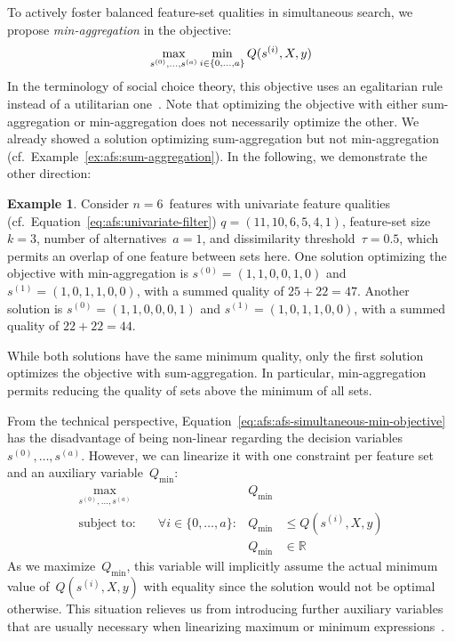 \documentclass{article}
\theoremstyle{definition}
\newtheorem{example}{Example}
\begin{document}
To actively foster balanced feature-set qualities in simultaneous search, we propose \emph{min-aggregation} in the objective:
%
\begin{equation}
	\max_{s^{(0)}, \dots, s^{(a)}} \min_{i \in \{0, \dots, a\}} Q(s^{(i)},X,y) \\
	\label{eq:afs:afs-simultaneous-min-objective}
\end{equation}
%
In the terminology of social choice theory, this objective uses an egalitarian rule instead of a utilitarian one~\cite{myerson1981utilitarianism}.
Note that optimizing the objective with either sum-aggregation or min-aggregation does not necessarily optimize the other.
We already showed a solution optimizing sum-aggregation but not min-aggregation (cf.~Example~\ref{ex:afs:sum-aggregation}).
In the following, we demonstrate the other direction:
%
\begin{example}
Consider $n=6$~features with univariate feature qualities (cf.~Equation~\ref{eq:afs:univariate-filter}) $q = (11,10,6,5,4,1)$, feature-set size~$k=3$, number of alternatives~$a=1$, and dissimilarity threshold~$\tau = 0.5$, which permits an overlap of one feature between sets here.
One solution optimizing the objective with min-aggregation is $s^{(0)} = (1,1,0,0,1,0)$ and $s^{(1)} = (1,0,1,1,0,0)$, with a summed quality of $25+22=47$.
Another solution is $s^{(0)} = (1,1,0,0,0,1)$ and $s^{(1)} = (1,0,1,1,0,0)$, with a summed quality of $22+22=44$.
\label{ex:afs:min-aggregation}
\end{example}
%
While both solutions have the same minimum quality, only the first solution optimizes the objective with sum-aggregation.
In particular, min-aggregation permits reducing the quality of sets above the minimum of all sets.

From the technical perspective, Equation~\ref{eq:afs:afs-simultaneous-min-objective} has the disadvantage of being non-linear regarding the decision variables $s^{(0)}, \dots, s^{(a)}$.
However, we can linearize it with one constraint per feature set and an auxiliary variable~$Q_{\text{min}}$:
%
\begin{equation}
	\begin{aligned}
		\max_{s^{(0)}, \dots, s^{(a)}} &\quad &Q_{\text{min}} & \\
		\text{subject to:} &\quad \forall i \in \{0, \dots, a\}: &Q_{\text{min}} &\leq Q(s^{(i)},X,y) \\
		&\quad & Q_{\text{min}} &\in \mathbb{R}
	\end{aligned}
	\label{eq:afs:afs-simultaneous-min-objective-linear}
\end{equation}
%
As we maximize~$Q_{\text{min}}$, this variable will implicitly assume the actual minimum value of~$Q(s^{(i)},X,y)$ with equality since the solution would not be optimal otherwise.
This situation relieves us from introducing further auxiliary variables that are usually necessary when linearizing maximum or minimum expressions~\cite{mosek2022modeling}.
\end{document}
